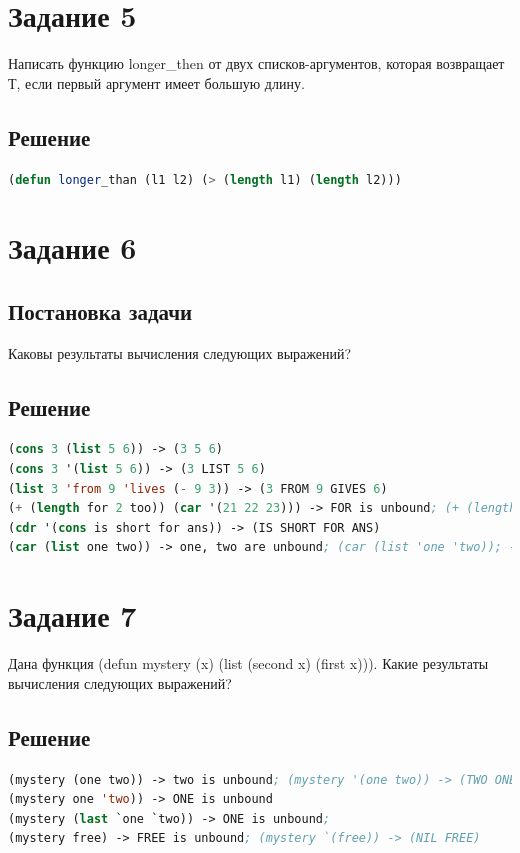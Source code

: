 \documentclass[12pt]{report}
\begin{document}
\section*{Задание 5}
Написать функцию longer\_then от двух списков-аргументов, которая возвращает Т, если первый аргумент имеет большую длину.

\subsection*{Решение}

\begin{lstlisting}[label=5xd,caption=Решение задания №5, language=lisp]
(defun longer_than (l1 l2) (> (length l1) (length l2)))
\end{lstlisting}

\section*{Задание 6}
\subsection*{Постановка задачи}
Каковы результаты вычисления следующих выражений?
\subsection*{Решение}

\begin{lstlisting}[label=6xd,caption=Решение задания №6, language=lisp]
(cons 3 (list 5 6)) -> (3 5 6)
(cons 3 '(list 5 6)) -> (3 LIST 5 6)
(list 3 'from 9 'lives (- 9 3)) -> (3 FROM 9 GIVES 6)
(+ (length for 2 too)) (car '(21 22 23))) -> FOR is unbound; (+ (length '(for 2 too)) (car '(21 22 23))) -> 24
(cdr '(cons is short for ans)) -> (IS SHORT FOR ANS)
(car (list one two)) -> one, two are unbound; (car (list 'one 'two)); -> one
\end{lstlisting}

\section*{Задание 7}
Дана функция (defun mystery (x) (list (second x) (first x))). Какие результаты вычисления следующих выражений?

\subsection*{Решение}
\begin{lstlisting}[label=7xd,caption=Решение задания №7, language=lisp]
(mystery (one two)) -> two is unbound; (mystery '(one two)) -> (TWO ONE)
(mystery one 'two)) -> ONE is unbound 
(mystery (last `one `two)) -> ONE is unbound;
(mystery free) -> FREE is unbound; (mystery `(free)) -> (NIL FREE)
\end{lstlisting}
\end{document}
